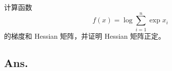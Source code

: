 \begin{example}
    计算函数 
    \[ 
    f(x) = \log \sum_{i=1}^n \exp x_i 
    \]
    的梯度和 Hessian 矩阵，并证明 Hessian 矩阵正定。
    \end{example}

    \subsection*{Ans.}
    